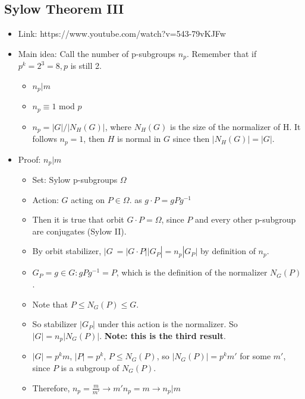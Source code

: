\documentclass[11pt, oneside]{article}   	%
\begin{document}
\subsection{Sylow Theorem III}
\begin{itemize}
\item Link: https://www.youtube.com/watch?v=543-79vKJFw
\item Main idea: Call the number of p-subgroups $n_p$.  Remember that if $p^k= 2^3 = 8, p$ is still 2.
\begin{itemize}
\item $n_p | m$
\item $n_p \equiv 1$ mod $p$
\item $n_p = |G| / |N_H(G)|$, where $N_H(G)$ is the size of the normalizer of H.  It follows $n_p = 1$, then $H$ is normal in $G$ since then $|N_H(G)| = |G|$.
\end{itemize}

\item Proof: $n_p | m$
\begin{itemize}
\item Set: Sylow p-subgroups $\Omega$
\item Action: $G$ acting on $P \in \Omega$. as $g \cdot P = gPg^{-1}$
\item Then it is true that orbit $G \cdot P = \Omega$, since $P$ and every other p-subgroup are conjugates (Sylow II).
\item By orbit stabilizer, $|G\ = |G \cdot P| |G_P| = n_p |G_P|$ by definition of $n_p$.
\item $G_P = { g \in G: gPg^{-1} = P}$, which is the definition of the normalizer $N_G(P)$.
\item Note that $P \leq N_G(P) \leq G$.
\item So stabilizer $|G_P|$ under this action is the normalizer.  So  $|G| = n_p |N_G(P)|$.  \textbf{Note: this is the third result}.
\item $|G| = p^km$, $|P| = p^k$, $P \leq N_G(P)$, so $|N_G(P)| = p^km'$ for some $m'$, since $P$ is a subgroup of $N_G(P)$.
\item Therefore, $n_p = \frac{m}{m'} \rightarrow m'n_p = m \rightarrow n_p | m$
\end{itemize}


\end{itemize}
\end{document}
